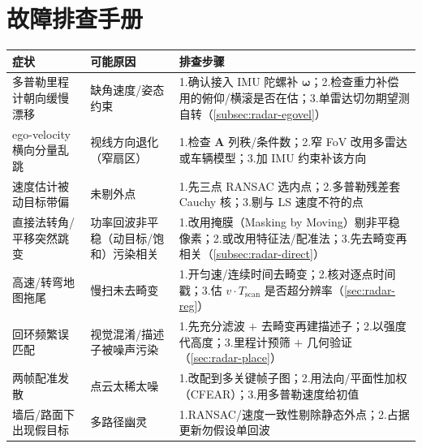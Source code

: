 \section*{故障排查手册}
\begin{table}[H]\centering\small
\begin{tabular}{p{} p{} p{}}
\toprule
症状 & 可能原因 & 排查步骤 \\
\midrule
多普勒里程计朝向缓慢漂移 & 缺角速度/姿态约束 & 1.确认接入 IMU 陀螺补 $\boldsymbol\omega$；2.检查重力补偿用的俯仰/横滚是否在估；3.单雷达切勿期望测自转（\cref{subsec:radar-egovel}）\\
ego-velocity 横向分量乱跳 & 视线方向退化（窄扇区） & 1.检查 $\mathbf A$ 列秩/条件数；2.窄 FoV 改用多雷达或车辆模型；3.加 IMU 约束补该方向 \\
速度估计被动目标带偏 & 未剔外点 & 1.先三点 RANSAC 选内点；2.多普勒残差套 Cauchy 核；3.剔与 LS 速度不符的点 \\
直接法转角/平移突然跳变 & 功率回波非平稳（动目标/饱和）污染相关 & 1.改用掩膜（Masking by Moving）剔非平稳像素；2.或改用特征法/配准法；3.先去畸变再相关（\cref{subsec:radar-direct}）\\
高速/转弯地图拖尾 & 慢扫未去畸变 & 1.开匀速/连续时间去畸变；2.核对逐点时间戳；3.估 $v\cdot T_{\text{scan}}$ 是否超分辨率（\cref{sec:radar-reg}）\\
回环频繁误匹配 & 视觉混淆/描述子被噪声污染 & 1.先充分滤波 $+$ 去畸变再建描述子；2.以强度代高度；3.里程计预筛 $+$ 几何验证（\cref{sec:radar-place}）\\
两帧配准发散 & 点云太稀太噪 & 1.改配到多关键帧子图；2.用法向/平面性加权（CFEAR）；3.用多普勒速度给初值 \\
墙后/路面下出现假目标 & 多路径幽灵 & 1.RANSAC/速度一致性剔除静态外点；2.占据更新勿假设单回波 \\
\bottomrule
\end{tabular}
\end{table}

